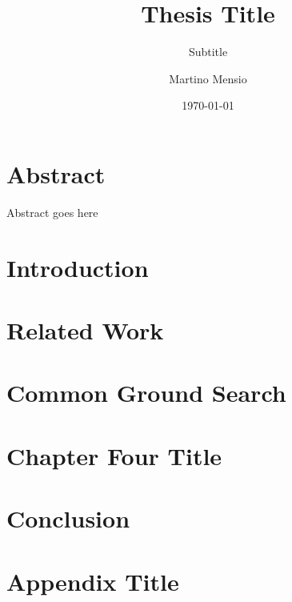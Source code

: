 \documentclass[12pt]{scrreprt}
\title{Thesis Title}
\subtitle{Subtitle}
\author{Martino Mensio}
\date{\today}
\begin{document}


\chapter*{Abstract}
Abstract goes here




\tableofcontents
\listoffigures
\listoftables

\chapter{Introduction}


\chapter{Related Work}


\chapter{Common Ground Search}


\chapter{Chapter Four Title}


\chapter{Conclusion}



\printbibliography[heading=bibintoc]
% 

\appendix
\chapter{Appendix Title}

\end{document}
